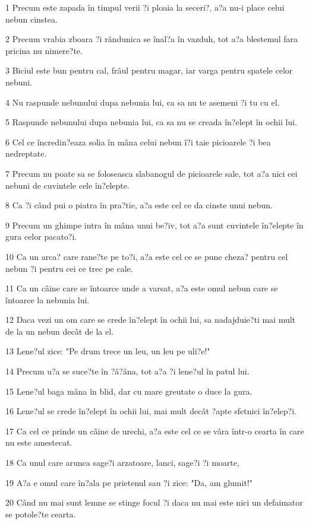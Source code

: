 \par 1 Precum este zapada în timpul verii ?i ploaia la seceri?, a?a nu-i place celui nebun cinstea.
\par 2 Precum vrabia zboara ?i rândunica se înal?a în vazduh, tot a?a blestemul fara pricina nu nimere?te.
\par 3 Biciul este bun pentru cal, frâul pentru magar, iar varga pentru spatele celor nebuni.
\par 4 Nu raspunde nebunului dupa nebunia lui, ca sa nu te asemeni ?i tu cu el.
\par 5 Raspunde nebunului dupa nebunia lui, ca sa nu se creada în?elept în ochii lui.
\par 6 Cel ce încredin?eaza solia în mâna celui nebun î?i taie picioarele ?i bea nedreptate.
\par 7 Precum nu poate sa se foloseasca slabanogul de picioarele sale, tot a?a nici cei nebuni de cuvintele cele în?elepte.
\par 8 Ca ?i când pui o piatra în pra?tie, a?a este cel ce da cinste unui nebun.
\par 9 Precum un ghimpe intra în mâna unui be?iv, tot a?a sunt cuvintele în?elepte în gura celor pacato?i.
\par 10 Ca un arca? care rane?te pe to?i, a?a este cel ce se pune cheza? pentru cel nebun ?i pentru cei ce trec pe cale.
\par 11 Ca un câine care se întoarce unde a varsat, a?a este omul nebun care se întoarce la nebunia lui.
\par 12 Daca vezi un om care se crede în?elept în ochii lui, sa nadajduie?ti mai mult de la un nebun decât de la el.
\par 13 Lene?ul zice: "Pe drum trece un leu, un leu pe uli?e!"
\par 14 Precum u?a se suce?te în ?â?âna, tot a?a ?i lene?ul în patul lui.
\par 15 Lene?ul baga mâna în blid, dar cu mare greutate o duce la gura.
\par 16 Lene?ul se crede în?elept în ochii lui, mai mult decât ?apte sfetnici în?elep?i.
\par 17 Ca cel ce prinde un câine de urechi, a?a este cel ce se vâra într-o cearta în care nu este amestecat.
\par 18 Ca unul care arunca sage?i arzatoare, lanci, sage?i ?i moarte,
\par 19 A?a e omul care în?ala pe prietenul sau ?i zice: "Da, am glumit!"
\par 20 Când nu mai sunt lemne se stinge focul ?i daca nu mai este nici un defaimator se potole?te cearta.
